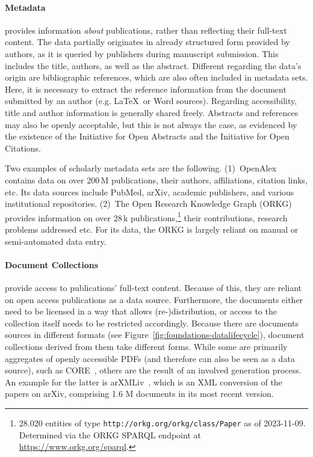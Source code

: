 \paragraph{Metadata}
provides information \emph{about} publications, rather than reflecting their full-text content. The data partially originates in already structured form provided by authors, as it is queried by publishers during manuscript submission. This includes the title, authors, as well as the abstract. Different regarding the data's origin are bibliographic references, which are also often included in metadata sets. Here, it is necessary to extract the reference information from the document submitted by an author (e.g. \LaTeX\ or Word sources). Regarding accessibility, title and author information is generally shared freely. Abstracts and references may also be openly acceptable, but this is not always the case, as evidenced by the existence of the Initiative for Open Abstracts and the Initiative for Open Citations.

Two examples of scholarly metadata sets are the following. (1)~OpenAlex~\cite{openalex} contains data on over 200\,M publications, their authors, affiliations, citation links, etc. Its data sources include PubMed, arXiv, academic publishers, and various institutional repositories.%
 (2)~The Open Research Knowledge Graph (ORKG)~\cite{orkg1,orkg2} provides information on over 28\,k publications,\footnote{28.020 entities of type \texttt{http://orkg.org/orkg/class/Paper} as of 2023-11-09. Determined via the ORKG SPARQL endpoint at \url{https://www.orkg.org/sparql}.} their contributions, research problems addressed etc. For its data, the ORKG is largely reliant on manual or semi-automated data entry.

\paragraph{Document Collections} provide access to publications' full-text content. Because of this, they are reliant on open access publications as a data source. Furthermore, the documents either need to be licensed in a way that allows (re-)distribution, or access to the collection itself needs to be restricted accordingly. Because there are documents sources in different formats (see Figure~\ref{fig:foundations-datalifecycle}), document collections derived from them take different forms. While some are primarily aggregates of openly accessible PDFs (and therefore can also be seen as a data source), such as CORE~\cite{core}, others are the result of an involved generation process. An example for the latter is arXMLiv~\cite{arXMLiv}, which is an XML conversion of the papers on arXiv, comprising 1.6 M documents in its most recent version.

